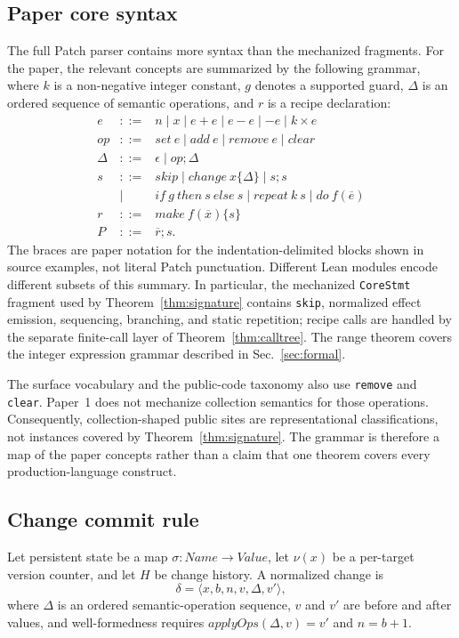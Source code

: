 \documentclass[10pt]{article}
\theoremstyle{plain}
\theoremstyle{remark}
\begin{document}
\subsection{Paper core syntax}
The full Patch parser contains more syntax than the mechanized fragments. For the paper, the relevant concepts are summarized by the following grammar, where $k$ is a non-negative integer constant, $g$ denotes a supported guard, $\Delta$ is an ordered sequence of semantic operations, and $r$ is a recipe declaration:
\[
\begin{array}{rcl}
e &::=& n \mid x \mid e+e \mid e-e \mid -e \mid k\times e \\
op &::=& set~e \mid add~e \mid remove~e \mid clear \\
\Delta &::=& \epsilon \mid op;\Delta \\
s &::=& skip \mid change~x\{\Delta\} \mid s;s \\
  &\mid& if~g~then~s~else~s \mid repeat~k~s \mid do~f(\overline e) \\
r &::=& make~f(\overline x)\{s\} \\
P &::=& \overline r;s.
\end{array}
\]
The braces are paper notation for the indentation-delimited blocks shown in source examples, not literal Patch punctuation. Different Lean modules encode different subsets of this summary. In particular, the mechanized \texttt{CoreStmt} fragment used by Theorem~\ref{thm:signature} contains \texttt{skip}, normalized effect emission, sequencing, branching, and static repetition; recipe calls are handled by the separate finite-call layer of Theorem~\ref{thm:calltree}. The range theorem covers the integer expression grammar described in Sec.~\ref{sec:formal}.

The surface vocabulary and the public-code taxonomy also use \texttt{remove} and \texttt{clear}. Paper~1 does not mechanize collection semantics for those operations. Consequently, collection-shaped public sites are representational classifications, not instances covered by Theorem~\ref{thm:signature}. The grammar is therefore a map of the paper concepts rather than a claim that one theorem covers every production-language construct.

\subsection{Change commit rule}
Let persistent state be a map $\sigma : Name \rightarrow Value$, let $\nu(x)$ be a per-target version counter, and let $H$ be change history. A normalized change is
\[
\delta=\langle x,b,n,v,\Delta,v'\rangle,
\]
where $\Delta$ is an ordered semantic-operation sequence, $v$ and $v'$ are before and after values, and well-formedness requires $applyOps(\Delta,v)=v'$ and $n=b+1$.
\end{document}

